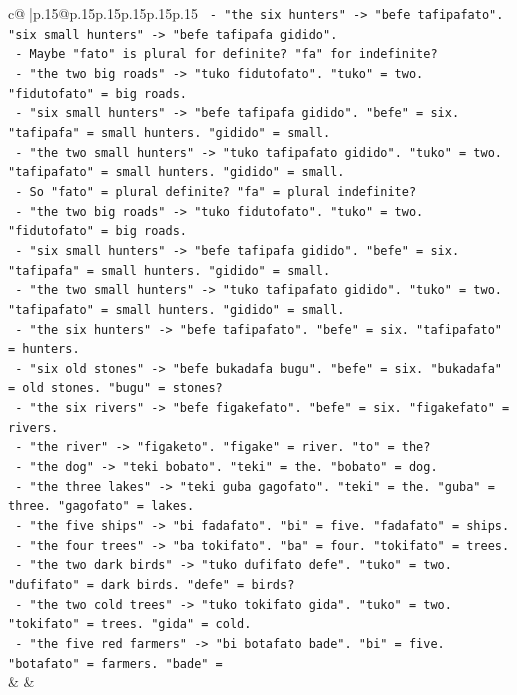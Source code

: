 \documentclass{article}
\begin{document}
{\begin{supertabular}{c@{$\;$}|p{.15\linewidth}@{}p{.15\linewidth}p{.15\linewidth}p{.15\linewidth}p{.15\linewidth}p{.15\linewidth}}
{{{\texttt{  {-} "the six hunters" {-}> "befe tafipafato". "six small hunters" {-}> "befe tafipafa gidido".} \\
\texttt{  {-} Maybe "fato" is plural for definite? "fa" for indefinite?} \\
\texttt{  {-} "the two big roads" {-}> "tuko fidutofato". "tuko" = two. "fidutofato" = big roads.} \\
\texttt{  {-} "six small hunters" {-}> "befe tafipafa gidido". "befe" = six. "tafipafa" = small hunters. "gidido" = small.} \\
\texttt{  {-} "the two small hunters" {-}> "tuko tafipafato gidido". "tuko" = two. "tafipafato" = small hunters. "gidido" = small.} \\
\texttt{  {-} So "fato" = plural definite? "fa" = plural indefinite?} \\
\texttt{  {-} "the two big roads" {-}> "tuko fidutofato". "tuko" = two. "fidutofato" = big roads.} \\
\texttt{  {-} "six small hunters" {-}> "befe tafipafa gidido". "befe" = six. "tafipafa" = small hunters. "gidido" = small.} \\
\texttt{  {-} "the two small hunters" {-}> "tuko tafipafato gidido". "tuko" = two. "tafipafato" = small hunters. "gidido" = small.} \\
\texttt{  {-} "the six hunters" {-}> "befe tafipafato". "befe" = six. "tafipafato" = hunters.} \\
\texttt{  {-} "six old stones" {-}> "befe bukadafa bugu". "befe" = six. "bukadafa" = old stones. "bugu" = stones?} \\
\texttt{  {-} "the six rivers" {-}> "befe figakefato". "befe" = six. "figakefato" = rivers.} \\
\texttt{  {-} "the river" {-}> "figaketo". "figake" = river. "to" = the?} \\
\texttt{  {-} "the dog" {-}> "teki bobato". "teki" = the. "bobato" = dog.} \\
\texttt{  {-} "the three lakes" {-}> "teki guba gagofato". "teki" = the. "guba" = three. "gagofato" = lakes.} \\
\texttt{  {-} "the five ships" {-}> "bi fadafato". "bi" = five. "fadafato" = ships.} \\
\texttt{  {-} "the four trees" {-}> "ba tokifato". "ba" = four. "tokifato" = trees.} \\
\texttt{  {-} "the two dark birds" {-}> "tuko dufifato defe". "tuko" = two. "dufifato" = dark birds. "defe" = birds?} \\
\texttt{  {-} "the two cold trees" {-}> "tuko tokifato gida". "tuko" = two. "tokifato" = trees. "gida" = cold.} \\
\texttt{  {-} "the five red farmers" {-}> "bi botafato bade". "bi" = five. "botafato" = farmers. "bade" =} \\
            }
        }
    }
    & & \\ \\


\end{supertabular}}
\end{document}
